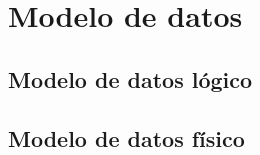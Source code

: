 \chapter{Modelo de datos}
\label{cap:modelo}

\section{Modelo de datos lógico}

\section{Modelo de datos físico}

\cleardoublepage

